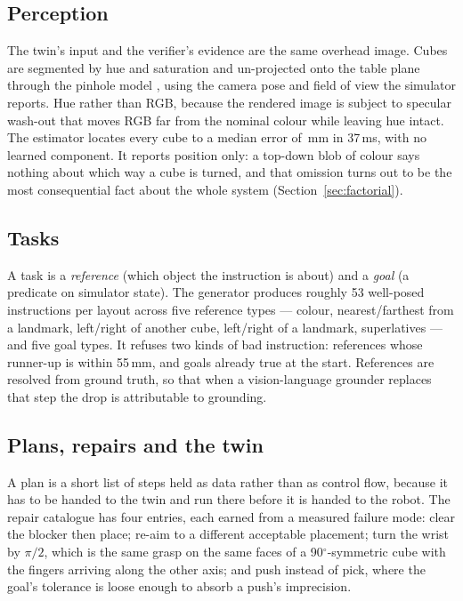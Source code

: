 \documentclass[11pt,a4paper]{article}
\begin{document}
\subsection{Perception}
The twin's input and the verifier's evidence are the same overhead image. Cubes
are segmented by hue and saturation and un-projected onto the table plane through
the pinhole model \citep{hartley2003multiple}, using the camera pose and field of
view the simulator reports. Hue rather than RGB, because the rendered image is
subject to specular wash-out that moves RGB far from the nominal colour while
leaving hue intact. The estimator locates every cube to a median error of
\numSigmaCube\,mm in 37\,ms, with no learned component. It reports position only:
a top-down blob of colour says nothing about which way a cube is turned, and that
omission turns out to be the most consequential fact about the whole system
(Section~\ref{sec:factorial}).

\subsection{Tasks}
A task is a \emph{reference} (which object the instruction is about) and a
\emph{goal} (a predicate on simulator state). The generator produces roughly 53
well-posed instructions per layout across five reference types --- colour,
nearest/farthest from a landmark, left/right of another cube, left/right of a
landmark, superlatives --- and five goal types. It refuses two kinds of bad
instruction: references whose runner-up is within 55\,mm, and goals already true
at the start. References are resolved from ground truth, so that when a
vision-language grounder replaces that step the drop is attributable to
grounding.

\subsection{Plans, repairs and the twin}
A plan is a short list of steps held as data rather than as control flow,
because it has to be handed to the twin and run there before it is handed to the
robot. The repair catalogue has four entries, each earned from a measured failure
mode: clear the blocker then place; re-aim to a different acceptable placement;
turn the wrist by $\pi/2$, which is the same grasp on the same faces of a
90$^\circ$-symmetric cube with the fingers arriving along the other axis; and
push instead of pick, where the goal's tolerance is loose enough to absorb a
push's imprecision.
\end{document}
